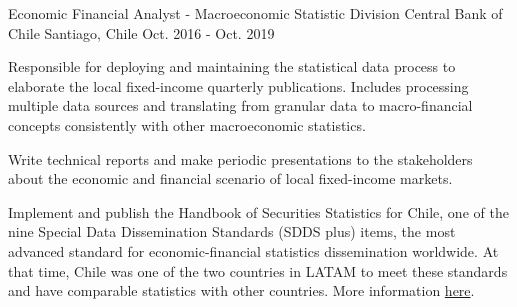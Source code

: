 \begin{cventries}
  \cventry
    {Economic Financial Analyst - Macroeconomic Statistic Division} %
    {Central Bank of Chile} %
    {Santiago, Chile} %
    {Oct. 2016 - Oct. 2019} %
    {
      \begin{cvitems} %
        \item {Responsible for deploying and maintaining the statistical data process to elaborate the local fixed-income quarterly publications. Includes processing multiple data sources and translating from granular data to macro-financial concepts consistently with other macroeconomic statistics.}
        \item {Write technical reports and make periodic presentations to the stakeholders about the economic and financial scenario of local fixed-income markets.}
        \item {Implement and publish the Handbook of Securities Statistics for Chile, one of the nine Special Data Dissemination Standards (SDDS plus) items, the most advanced standard for economic-financial statistics dissemination worldwide. At that time, Chile was one of the two countries in LATAM to meet these standards and have comparable statistics with other countries. More information \href{https://www.bcentral.cl/en/detail-news-and-publications/-/asset_publisher/Exzd7l9NC3Y6/content/id/2228947}{here}.}
      \end{cvitems}
    }

\end{cventries}
